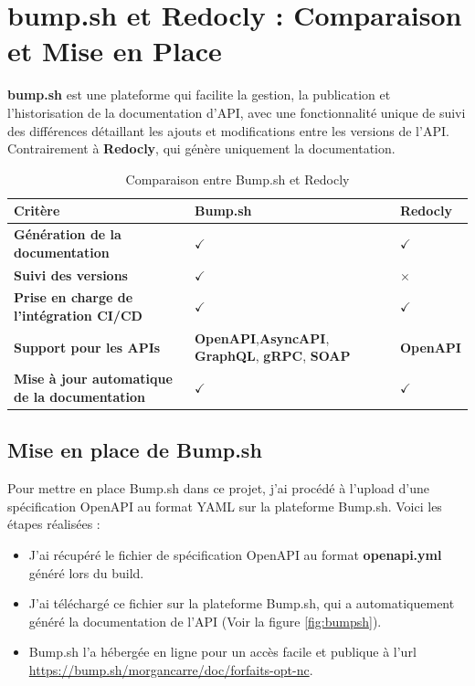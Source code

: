 \documentclass[11pt]{article}
\begin{document}
		\section{bump.sh et Redocly : Comparaison et Mise en Place}
		
		\textbf{bump.sh} est une plateforme qui facilite la gestion, la publication et l'historisation de la documentation d’API, avec une fonctionnalité unique de suivi des différences détaillant les ajouts et modifications entre les versions de l'API. Contrairement à \textbf{Redocly}, qui génère uniquement la documentation.
		\begin{table}[h!]
			\centering
			\begin{tabularx}{\textwidth}{|X|X|X|}
				\hline
				\textbf{Critère} & \textbf{Bump.sh} & \textbf{Redocly} \\
				\hline
				\textbf{Génération de la documentation} & $\checkmark$ & $\checkmark$ \\
				\hline
				\textbf{Suivi des versions} & $\checkmark$ & $\times$ \\
				\hline
				\textbf{Prise en charge de l'intégration CI/CD} & $\checkmark$ & $\checkmark$ \\
				\hline
				\textbf{Support pour les APIs} &  \textbf{OpenAPI},\textbf{AsyncAPI}, \textbf{GraphQL}, \textbf{gRPC}, \textbf{SOAP} & \textbf{OpenAPI} \\
				\hline
				\textbf{Mise à jour automatique de la documentation} & $\checkmark$ & $\checkmark$ \\
				\hline
			\end{tabularx}
			\caption{Comparaison entre Bump.sh et Redocly}
		\end{table}
		\subsection*{Mise en place de Bump.sh}
		
		Pour mettre en place Bump.sh dans ce projet, j'ai procédé à l'upload d'une spécification OpenAPI au format YAML sur la plateforme Bump.sh. Voici les étapes réalisées :
		
		\begin{itemize}
			\item J'ai récupéré le fichier de spécification OpenAPI au format \textbf{openapi.yml} généré lors du build.
			\item J'ai téléchargé ce fichier sur la plateforme Bump.sh, qui a automatiquement généré la documentation de l'API (Voir la figure \ref{fig:bumpsh}).
			\item Bump.sh l'a hébergée en ligne pour un accès facile et publique à l'url \url{https://bump.sh/morgancarre/doc/forfaits-opt-nc}.
		\end{itemize}
			
\end{document}
